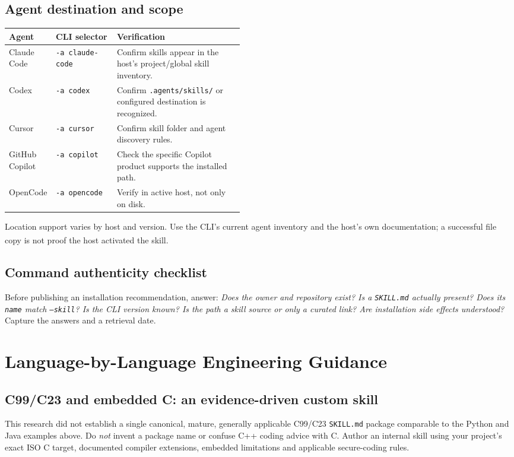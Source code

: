 \documentclass[11pt,letterpaper]{article}
\newcommand{\src}[1]{\textsuperscript{\textcolor{teal}{\cite{#1}}}}
\begin{document}
\subsection{Agent destination and scope}
\begin{tabularx}{\linewidth}{@{}p{0.20\linewidth}p{0.26\linewidth}X@{}}
\toprule
\textbf{Agent} & \textbf{CLI selector} & \textbf{Verification}\\\midrule
Claude Code & \texttt{-a claude-code} & Confirm skills appear in the host's project/global skill inventory.\\
Codex & \texttt{-a codex} & Confirm \texttt{.agents/skills/} or configured destination is recognized.\\
Cursor & \texttt{-a cursor} & Confirm skill folder and agent discovery rules.\\
GitHub Copilot & \texttt{-a copilot} & Check the specific Copilot product supports the installed path.\\
OpenCode & \texttt{-a opencode} & Verify in active host, not only on disk.\\
\bottomrule
\end{tabularx}
Location support varies by host and version. Use the CLI's current agent inventory and the host's own documentation; a successful file copy is not proof the host activated the skill.\src{vercelcommands,goskills}

\subsection{Command authenticity checklist}
Before publishing an installation recommendation, answer: \emph{Does the owner and repository exist? Is a \texttt{SKILL.md} actually present? Does its \texttt{name} match \texttt{--skill}? Is the CLI version known? Is the path a skill source or only a curated link? Are installation side effects understood?} Capture the answers and a retrieval date.

\section{Language-by-Language Engineering Guidance}
\subsection{C99/C23 and embedded C: an evidence-driven custom skill}
This research did not establish a single canonical, mature, generally applicable C99/C23 \texttt{SKILL.md} package comparable to the Python and Java examples above. Do \emph{not} invent a package name or confuse C++ coding advice with C. Author an internal skill using your project's exact ISO C target, documented compiler extensions, embedded limitations and applicable secure-coding rules.
\end{document}
